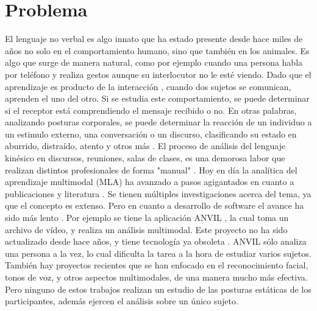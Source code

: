\section{Problema}
El lenguaje no verbal es algo innato que ha estado presente desde hace miles de años no solo en el comportamiento humano, sino que también en los animales. Es algo que surge de manera natural, como por ejemplo cuando una persona habla por teléfono y realiza gestos aunque su interlocutor no le esté viendo. 
Dado que el aprendizaje es producto de la interacción \cite{ref3}, cuando dos sujetos se comunican, aprenden el uno del otro. Si se estudia este comportamiento, se puede determinar si el receptor está comprendiendo el mensaje recibido o no.
En otras palabras, analizando posturas corporales, se puede determinar la reacción de un individuo a un estimulo externo, una conversación o un discurso, clasificando su estado en aburrido, distraído, atento y otros más \cite{ref13}.
El proceso de análisis del lenguaje kinésico en discursos, reuniones, salas de clases, es una demorosa labor que realizan distintos profesionales de forma "manual" \cite{ref10}. Hoy en día la analítica del aprendizaje multimodal (MLA) ha avanzado a pasos agigantados en cuanto a publicaciones y literatura \cite{ref2}. Se tienen múltiples investigaciones acerca del tema, ya que el concepto es extenso. Pero en cuanto a desarrollo de software el avance ha sido más lento \cite{ref2}. Por ejemplo se tiene la aplicación ANVIL \cite{ref11}, la cual toma un archivo de vídeo, y realiza un análisis multimodal. Este proyecto no ha sido actualizado desde hace años, y tiene tecnología ya obsoleta \cite{ref2}. ANVIL sólo analiza una persona a la vez, lo cual dificulta la tarea a la hora de estudiar varios sujetos. También hay proyectos recientes que se han enfocado en el reconocimiento facial, tonos de voz, y otros aspectos multimodales, de una manera mucho más efectiva. Pero ninguno de estos trabajos realizan un estudio de las posturas estáticas de los participantes, además ejercen el análisis sobre un único sujeto.

